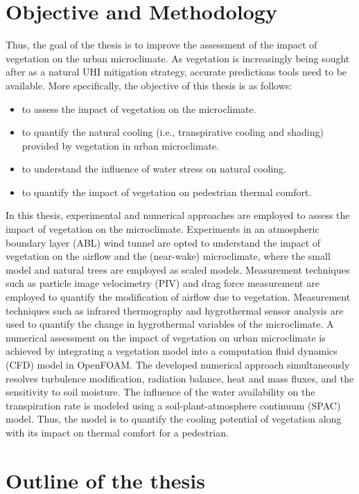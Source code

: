 \section{Objective and Methodology}

Thus, the goal of the thesis is to improve the assessment of the impact of vegetation on the urban microclimate. As vegetation is increasingly being sought after as a natural UHI mitigation strategy, accurate predictions tools need to be available. More specifically, the objective of this thesis is as follows:
\begin{itemize}
	\item to assess the impact of vegetation on the microclimate.
	\item to quantify the natural cooling (i.e., transpirative cooling and shading) provided by vegetation in urban microclimate.
	\item to understand the influence of water stress on natural cooling.
	\item to quantify the impact of vegetation on pedestrian thermal comfort. 
\end{itemize}

In this thesis, experimental and numerical approaches are employed to assess the impact of vegetation on the microclimate. Experiments in an atmospheric boundary layer (ABL) wind tunnel are opted to understand the impact of vegetation on the airflow and the (near-wake) microclimate, where the small model and natural trees are employed as scaled models. Measurement techniques such as particle image velocimetry (PIV) and drag force measurement are employed to quantify the modification of airflow due to vegetation. Measurement techniques such as infrared thermography and hygrothermal sensor analysis are used to quantify the change in hygrothermal variables of the microclimate. A numerical assessment on the impact of vegetation on urban microclimate is achieved by integrating a vegetation model into a computation fluid dynamics (CFD) model in OpenFOAM. The developed numerical approach simultaneously resolves turbulence modification, radiation balance, heat and mass fluxes, and the sensitivity to soil moisture. The influence of the water availability on the transpiration rate is modeled using a soil-plant-atmosphere continuum (SPAC) model.  Thus, the model is to quantify the cooling potential of vegetation along with its impact on thermal comfort for a pedestrian.

\section{Outline of the thesis}

